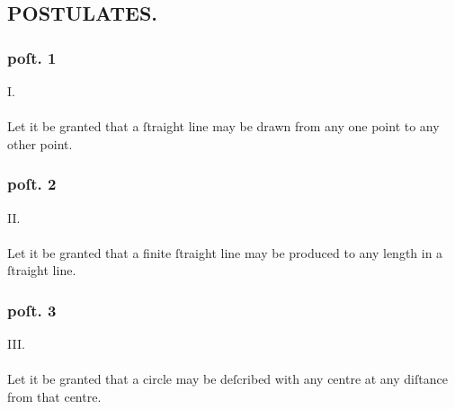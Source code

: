 \hfill

\hfill

\begin{minipage}{0.67\textwidth}
    \subsection[Postulates]{\centering \scshape{\LARGE{POSTULATES.}}}
    \label{subsec:postulates}

    \hfill

    \subsubsection{poſt. 1}
    \begin{center}
        I.\label{post1}\\
        \hfill\\
        Let it be granted that a ſtraight line may be drawn from any one point to any other point.
    \end{center}
    \subsubsection{poſt. 2}
    \begin{center}
        II.\label{post2}\\
        \hfill\\
        Let it be granted that a finite ſtraight line may be produced to any length in a ſtraight line.
    \end{center}
    \subsubsection{poſt. 3}
    \begin{center}
        III.\label{post3}\\
        \hfill\\
        Let it be granted that a circle may be deſcribed with any centre at any diſtance from that centre.
    \end{center}
\end{minipage}

\hfill

